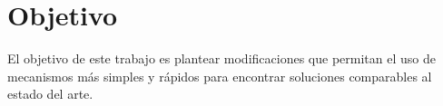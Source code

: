 \section{Objetivo}
El objetivo de este trabajo es plantear modificaciones que permitan el uso de mecanismos más simples y rápidos para encontrar soluciones comparables al estado del arte.
